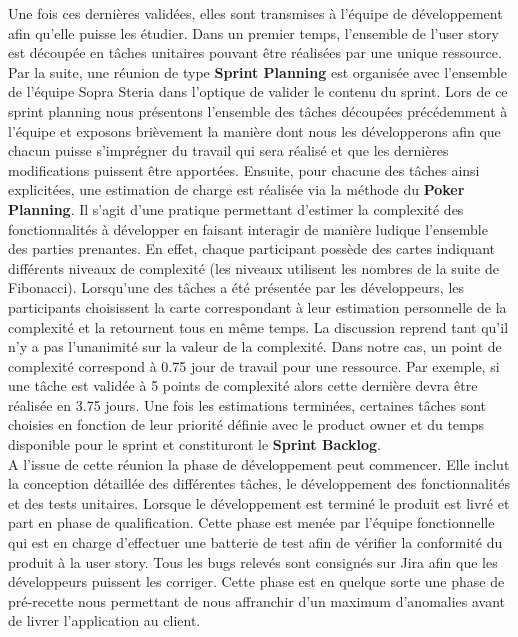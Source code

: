 	Une fois ces dernières validées, elles sont transmises à l'équipe de développement afin qu'elle puisse les étudier. Dans un premier temps, l’ensemble de l’user story est découpée en tâches unitaires pouvant être réalisées par une unique ressource. Par la suite, une réunion de type \textbf{Sprint Planning} est organisée avec l'ensemble de l'équipe Sopra Steria dans l’optique de valider le contenu du sprint. Lors de ce sprint planning nous présentons l’ensemble des tâches découpées précédemment à l’équipe et exposons brièvement la manière dont nous les développerons afin que chacun puisse s’imprégner du travail qui sera réalisé et que les dernières modifications puissent être apportées. Ensuite, pour chacune des tâches ainsi explicitées, une estimation de charge est réalisée via la méthode du \textbf{Poker Planning}. Il s’agit d’une pratique permettant d’estimer la complexité des fonctionnalités à développer en faisant interagir de manière ludique l’ensemble des parties prenantes. En effet, chaque participant possède des cartes indiquant différents niveaux de complexité (les niveaux utilisent les nombres de la suite de Fibonacci). Lorsqu’une des tâches a été présentée par les développeurs, les participants choisissent la carte correspondant à leur estimation personnelle de la complexité et la retournent tous en même temps. La discussion reprend tant qu’il n’y a pas l’unanimité sur la valeur de la complexité. Dans notre cas, un point de complexité correspond à 0.75 jour de travail pour une ressource. Par exemple, si une tâche est validée à 5 points de complexité alors cette dernière devra être réalisée en 3.75 jours. Une fois les estimations terminées, certaines tâches sont choisies en fonction de leur priorité définie avec le product owner et du temps disponible pour le sprint et constituront le \textbf{Sprint Backlog}.\\
	
	A l'issue de cette réunion la phase de développement peut commencer. Elle inclut la conception détaillée des différentes tâches, le développement des fonctionnalités et des tests unitaires. Lorsque le développement est terminé le produit est livré et part en phase de qualification. Cette phase est menée par l'équipe fonctionnelle qui est en charge d'effectuer une batterie de test afin de vérifier la conformité du produit à la user story. Tous les bugs relevés sont consignés sur Jira afin que les développeurs puissent les corriger. Cette phase est en quelque sorte une phase de pré-recette nous permettant de nous affranchir d'un maximum d'anomalies avant de livrer l'application au client.

